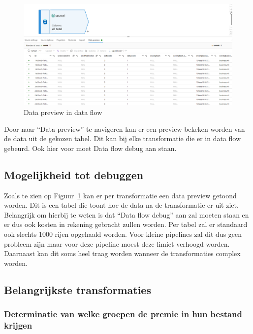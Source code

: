 \begin{figure}[H]
    \centering
    \includegraphics[width=1\textwidth]{./graphics/adf/source_table_8_specific.png}
    \caption{Data preview in data flow}
    \label{fig:data-preview}
\end{figure}

Door naar ``Data preview'' te navigeren kan er een preview bekeken worden van de data uit de gekozen tabel. Dit kan bij elke transformatie die er in data flow gebeurd. Ook hier voor moet Data flow debug aan staan.

\subsection{Mogelijkheid tot debuggen}

Zoals te zien op Figuur~\ref{fig:data-preview} kan er per transformatie een data preview getoond worden. Dit is een tabel die toont hoe de data na de transformatie er uit ziet. Belangrijk om hierbij te weten is dat ``Data flow debug'' aan zal moeten staan en er dus ook kosten in rekening gebracht zullen worden. Per tabel zal er standaard ook slechts 1000 rijen opgehaald worden. Voor kleine pipelines zal dit dus geen probleem zijn maar voor deze pipeline moest deze limiet verhoogd worden. Daarnaast kan dit soms heel traag worden wanneer de transformaties complex worden.

\pagebreak 

\subsection{Belangrijkste transformaties}

\subsubsection{Determinatie van welke groepen de premie in hun bestand krijgen}

